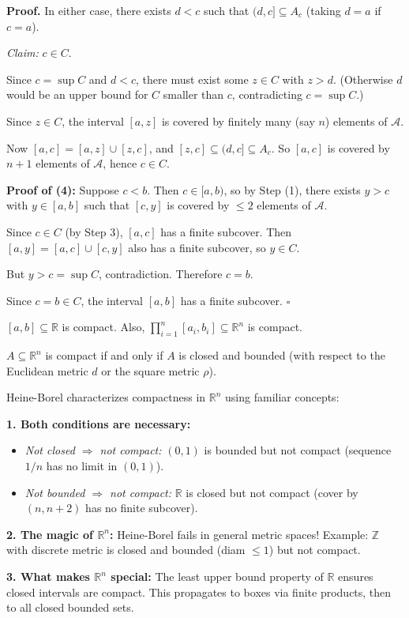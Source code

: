\documentclass[11pt]{report}
\renewenvironment{proof}[1][Proof]{\noindent\textbf{#1.} }{\hfill$\square$\par\vspace{5pt}}
\begin{document}
\begin{proof}
In either case, there exists $d < c$ such that $(d, c] \subseteq A_c$ (taking $d = a$ if $c = a$).

\textit{Claim:} $c \in C$.

Since $c = \sup C$ and $d < c$, there must exist some $z \in C$ with $z > d$. (Otherwise $d$ would be an upper bound for $C$ smaller than $c$, contradicting $c = \sup C$.)

Since $z \in C$, the interval $[a, z]$ is covered by finitely many (say $n$) elements of $\mathcal{A}$.

Now $[a, c] = [a, z] \cup [z, c]$, and $[z, c] \subseteq (d, c] \subseteq A_c$. So $[a, c]$ is covered by $n + 1$ elements of $\mathcal{A}$, hence $c \in C$.

\textbf{Proof of (4):} Suppose $c < b$. Then $c \in [a, b)$, so by Step (1), there exists $y > c$ with $y \in [a, b]$ such that $[c, y]$ is covered by $\leq 2$ elements of $\mathcal{A}$.

Since $c \in C$ (by Step 3), $[a, c]$ has a finite subcover. Then $[a, y] = [a, c] \cup [c, y]$ also has a finite subcover, so $y \in C$.

But $y > c = \sup C$, contradiction. Therefore $c = b$.

Since $c = b \in C$, the interval $[a, b]$ has a finite subcover.
\end{proof}

\begin{corbox}
$[a, b] \subseteq \mathbb{R}$ is compact. Also, $\prod_{i=1}^{n} [a_i, b_i] \subseteq \mathbb{R}^n$ is compact.
\end{corbox}

\begin{thmbox}
$A \subseteq \mathbb{R}^n$ is compact if and only if $A$ is closed and bounded (with respect to the Euclidean metric $d$ or the square metric $\rho$).
\end{thmbox}

\begin{rembox}
Heine-Borel characterizes compactness in $\mathbb{R}^n$ using familiar concepts:

\textbf{1. Both conditions are necessary:}
\begin{itemize}
    \item \textit{Not closed $\Rightarrow$ not compact:} $(0,1)$ is bounded but not compact (sequence $1/n$ has no limit in $(0,1)$).
    \item \textit{Not bounded $\Rightarrow$ not compact:} $\mathbb{R}$ is closed but not compact (cover by $(n, n+2)$ has no finite subcover).
\end{itemize}

\textbf{2. The magic of $\mathbb{R}^n$:} Heine-Borel fails in general metric spaces! Example: $\mathbb{Z}$ with discrete metric is closed and bounded (diam $\leq 1$) but not compact.

\textbf{3. What makes $\mathbb{R}^n$ special:} The least upper bound property of $\mathbb{R}$ ensures closed intervals are compact. This propagates to boxes via finite products, then to all closed bounded sets.
\end{rembox}
\end{document}

